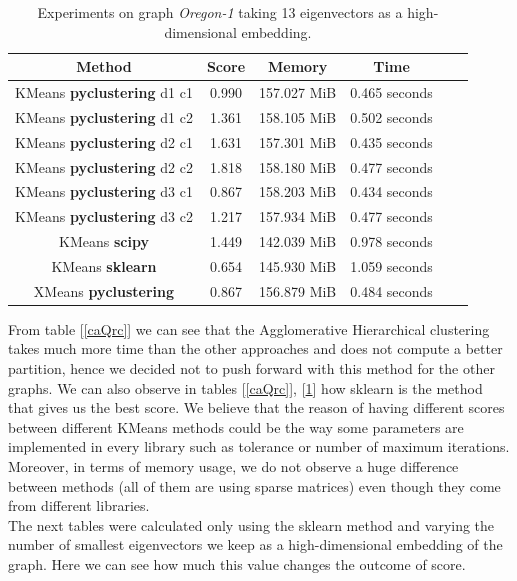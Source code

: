 \documentclass[11pt]{extarticle}
\begin{document}
\begin{table}[H]
\centering
\begin{tabular}{|c|c|c|c|c|c|}
\hline
\textbf{Method} & \textbf{Score} & \textbf{Memory} & \textbf{Time}\\ \hline
KMeans \textbf{pyclustering} d1 c1 & 0.990 & 157.027 MiB & 0.465 seconds\\ \hline
KMeans \textbf{pyclustering} d1 c2 & 1.361 & 158.105 MiB  &  0.502 seconds \\ \hline
KMeans \textbf{pyclustering} d2 c1 & 1.631 & 157.301 MiB  & 0.435 seconds\\ \hline
KMeans \textbf{pyclustering} d2 c2 & 1.818 & 158.180 MiB & 0.477 seconds\\ \hline
KMeans \textbf{pyclustering} d3 c1 & 0.867 &  158.203 MiB & 0.434 seconds\\ \hline 
KMeans \textbf{pyclustering} d3 c2 & 1.217 & 157.934 MiB &  0.477 seconds\\ \hline
KMeans \textbf{scipy} & 1.449 & 142.039 MiB & 0.978 seconds \\ \hline
KMeans \textbf{sklearn} & 0.654 & 145.930 MiB & 1.059 seconds \\ \hline
XMeans \textbf{pyclustering}  & 0.867 & 156.879 MiB & 0.484 seconds \\ \hline
\end{tabular}
\caption{Experiments on graph \textit{Oregon-1} taking 13 eigenvectors as a high-dimensional embedding.}
\label{Oregon1}
\end{table}

From table [\ref{caQrc}] we can see that the Agglomerative Hierarchical clustering takes much more time than the other approaches and does not compute a better partition, hence we decided not to push forward with this method for the other graphs. We can also observe in tables [\ref{caQrc}], [\ref{Oregon1}] how sklearn is the method that gives us the best score. We believe that the reason of having different scores between different KMeans methods could be the way some parameters are implemented in every library such as tolerance or number of maximum iterations. Moreover, in terms of memory usage, we do not observe a huge difference between methods (all of them are using sparse matrices) even though they come from different libraries.\\

The next tables were calculated only using the sklearn method and varying the number of smallest eigenvectors we keep as a high-dimensional embedding of the graph. Here we can see how much this value changes the outcome of score.
\end{document}
